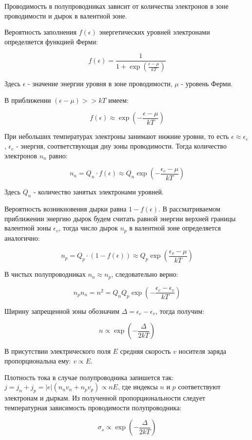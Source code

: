 \documentclass[a4paper,12pt]{report}
\begin{document}
	Проводимость в полупроводниках зависит от количества электронов в зоне проводимости и дырок в валентной зоне. 
	
	Вероятность заполнения $f(\epsilon)$ энергетических уровней электронами определяется функцией Ферми: 
	
	\[ f(\epsilon) = \frac{1}{1 + \exp\left(\frac{\epsilon - \mu}{kT}\right)} \]
	
	Здесь $\epsilon$ - значение энергии уровня в зоне проводимости, $\mu$ - уровень Ферми. 
	
	В приближении $(\epsilon - \mu) >> kT$ имеем: 
	
	\[ f(\epsilon) \approx \exp\left(-\frac{\epsilon - \mu}{kT}\right) \] 
	
	При небольших температурах электроны занимают нижние уровни, то есть $\epsilon \approx \epsilon_c$, $\epsilon_c$ - энергия, соответствующая дну зоны проводимости. Тогда количество электронов $n_n$ равно: 
	
	\[ n_n = Q_n\cdot f(\epsilon) \approx Q_n\exp\left(-\frac{\epsilon_c - \mu}{kT}\right) \]
	
	Здесь $Q_n$ - количество занятых электронами уровней.
	
	Вероятность возникновения дырки равна $1 - f(\epsilon)$. В рассматриваемом приближении энергию дырок будем считать равной энергии верхней границы валентной зоны $\epsilon_v$, тогда число дырок $n_p$ в валентной зоне определяется аналогично: 
	
	\[ n_p = Q_p \cdot (1 - f(\epsilon)) \approx Q_p \exp\left(\frac{\epsilon_v - \mu}{kT}\right) \]
	
	В чистых полупроводниках $n_n \approx n_p$, следовательно верно: 
	
	\[ n_pn_n = n^2 = Q_nQ_p\exp\left(-\frac{\epsilon_c - \epsilon_v}{kT}\right) \]
	
	Ширину запрещенной зоны обозначим $\Delta = \epsilon_c - \epsilon_v$, тогда получим: 
	
	\[ n \propto \exp\left(-\frac{\Delta}{2kT}\right) \]	
	
	В присутствии электрического поля $E$ средняя скорость $v$ носителя заряда пропорциональна ему: $v \propto E$. 
	
	Плотность тока в случае полупроводника запишется так: $j = j_n + j_p = |e|(n_nv_n + n_pv_p) \propto nE$, где индексы $n$ и $p$ соответствуют электронам и дыркам. Из полученной пропорциональности следует температурная зависимость проводимости полупроводника: 
	
	\[ \sigma_s \propto \exp\left(-\frac{\Delta}{2kT}\right) \]
	
\end{document}
